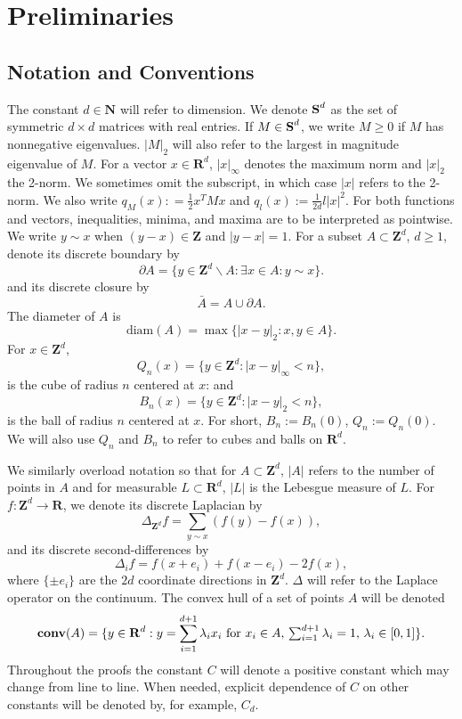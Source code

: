 \documentclass[12pt]{amsart}
\newcommand{\R}{\mathbf{R}}
\newcommand{\Z}{\mathbf{Z}}
\newcommand{\N}{\mathbf{N}}
\newcommand{\symm}{{\mbox{\bf S}}}  %
\newcommand{\diam}{{\mbox{diam}}}  %
\newcommand{\conv}{\mathop{\bf conv}}
\begin{document}


\section{Preliminaries} \label{prelims}


\subsection{Notation and Conventions} 
The constant $d \in \N$ will refer to dimension.
We denote $\symm^d$ as the set of symmetric $d \times d$ matrices with real entries. If $M \in \symm^d$, we write $M \geq 0$ if $M$ has nonnegative eigenvalues.  $|M|_2$ will also refer to the largest in magnitude eigenvalue of $M$. 
 For a vector $x \in \R^d$, $|x|_\infty$ denotes the maximum norm and $|x|_2$ the 2-norm. We sometimes omit the subscript, in which case $|x|$ refers to the 2-norm. We also write $q_M(x) : =  \frac{1}{2} x^T M x$ and $q_l(x) :=  \frac{1}{2d} l |x|^2$. For both functions and vectors, inequalities, minima, and maxima are to be interpreted as pointwise. We write $y \sim x$ when $(y - x) \in \Z$ and $|y-x| = 1$. 
For a subset $A \subset \Z^d$, $d \geq 1$, denote its discrete boundary by 
\[
\partial A = \{ y \in \Z^d \backslash A : \exists x \in A: y \sim x \}. 
\]
and its discrete closure by 
\[
\bar{A} = A \cup \partial A. 
\]
The diameter of $A$ is 
\[
\diam(A) = \max\{ |x-y|_2 : x,y \in A\}.
\]
For $x \in \Z^d$,
\[
Q_n(x) = \{ y \in \Z^d : |x-y|_\infty  < n \}, 
\]
is the cube of radius $n$ centered at $x$:  
and 
\[
B_n(x) = \{y \in \Z^d: |x - y|_2 < n\}, 
\]
is the ball of radius $n$ centered at $x$. For short, $B_n := B_n(0)$, $Q_n := Q_n(0)$.  We will also use $Q_n$ and $B_n$
to refer to cubes and balls on $\R^d$.

We similarly overload notation so that for $A \subset \Z^d$, $|A|$ refers to the number of points in $A$ and for measurable $L \subset \R^d$, $|L|$ is the Lebesgue measure of $L$. For $f: \Z^d \to \R$, we denote its discrete Laplacian by  
\[
\Delta_{\Z^d} f = \sum_{y \sim x} ( f(y) - f(x)), 
\]
and its discrete second-differences by
\[
\Delta_i f = f(x+e_i) + f(x-e_i) - 2 f(x), 
\]
where $\{ \pm e_i\}$  are the $2 d$ coordinate directions in $\Z^d$.   $\Delta$ will refer to the Laplace operator on the continuum.  The convex hull of a set of points $A$ will be denoted 
\[
\conv(A) = \{y \in \R^d:  y = \sum_{i=1}^{d+1} \lambda_i x_i \mbox{ for $x_i \in A$, $\sum_{i=1}^{d+1} \lambda_i  = 1$, $\lambda_i \in [0,1]$}\}.
\]
Throughout the proofs the constant $C$ will denote a positive constant which may change from line to line. When needed, explicit dependence of 
$C$ on other constants will be denoted by, for example, $C_d$.
\end{document}
